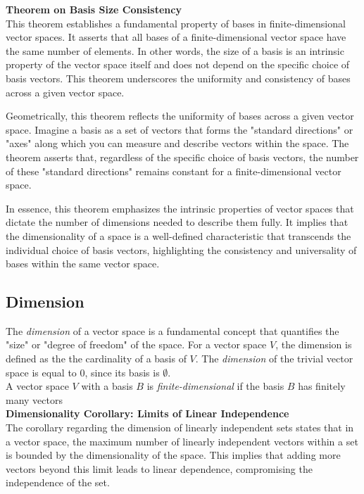 \textbf{Theorem on Basis Size Consistency}\\
This theorem establishes a fundamental property of bases in finite-dimensional vector spaces. It asserts that all bases of a finite-dimensional vector space have the same number of elements. In other words, the size of a basis is an intrinsic property of the vector space itself and does not depend on the specific choice of basis vectors. This theorem underscores the uniformity and consistency of bases across a given vector space.

Geometrically, this theorem reflects the uniformity of bases across a given vector space. Imagine a basis as a set of vectors that forms the "standard directions" or "axes" along which you can measure and describe vectors within the space. The theorem asserts that, regardless of the specific choice of basis vectors, the number of these "standard directions" remains constant for a finite-dimensional vector space.

In essence, this theorem emphasizes the intrinsic properties of vector spaces that dictate the number of dimensions needed to describe them fully. It implies that the dimensionality of a space is a well-defined characteristic that transcends the individual choice of basis vectors, highlighting the consistency and universality of bases within the same vector space.

\subsection{Dimension}

The \emph{dimension} of a vector space is a fundamental concept that quantifies the "size" or "degree of freedom" of the space. For a vector space $V$, the dimension is defined as the  the cardinality of a basis of $V$. The \emph{dimension} of the trivial vector space is equal to 0, since its basis is $\emptyset$.
\\

A vector space $V$ with a basis $B$ is \emph{finite-dimensional} if the basis $B$ has finitely many vectors
\\

\textbf{Dimensionality Corollary: Limits of Linear Independence}\\
The corollary regarding the dimension of linearly independent sets states that in a vector space, the maximum number of linearly independent vectors within a set is bounded by the dimensionality of the space. This implies that adding more vectors beyond this limit leads to linear dependence, compromising the independence of the set. 
\\

